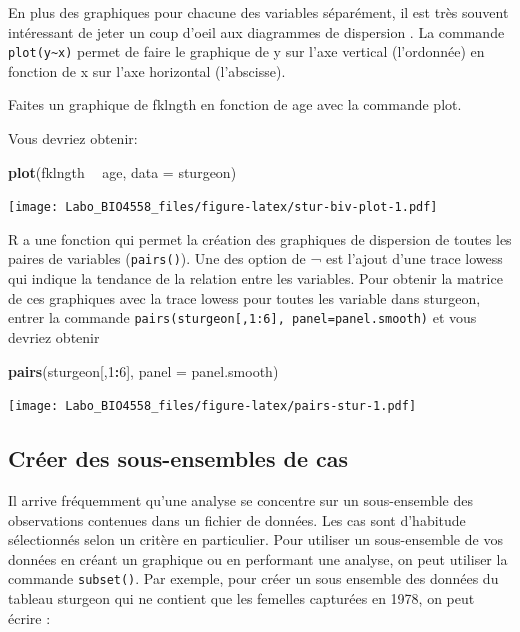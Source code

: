 \documentclass[12pt,]{book}
\makeatletter
\newenvironment{Shaded}{\begin{snugshade}}{\end{snugshade}}
\newcommand{\DataTypeTok}[1]{\textcolor[rgb]{0.27,0.27,0.27}{#1}}
\newcommand{\DecValTok}[1]{\textcolor[rgb]{0.06,0.06,0.06}{#1}}
\newcommand{\KeywordTok}[1]{\textcolor[rgb]{0.27,0.27,0.27}{\textbf{#1}}}
\newcommand{\NormalTok}[1]{#1}
\newcommand{\OperatorTok}[1]{\textcolor[rgb]{0.43,0.43,0.43}{\textbf{#1}}}
\newcommand{\StringTok}[1]{\textcolor[rgb]{0.5,0.5,0.5}{#1}}
\newenvironment{kframe}{%
\medskip{}
\setlength{\fboxsep}{.8em}
 \def\at@end@of@kframe{}%
 \ifinner\ifhmode%
  \def\at@end@of@kframe{\end{minipage}}%
  \begin{minipage}{\columnwidth}%
 \fi\fi%
 \def\FrameCommand##1{\hskip\@totalleftmargin \hskip-\fboxsep
 \colorbox{shadecolor}{##1}\hskip-\fboxsep
     \hskip-\linewidth \hskip-\@totalleftmargin \hskip\columnwidth}%
 \MakeFramed {\advance\hsize-\width
   \@totalleftmargin\z@ \linewidth\hsize
   \@setminipage}}%
 {\par\unskip\endMakeFramed%
 \at@end@of@kframe}
\newenvironment{rmdblock}[1]
  {
  \begin{itemize}
  \renewcommand{\labelitemi}{
    \raisebox{-.7\height}[0pt][0pt]{
      {\setkeys{Gin}{width=3em,keepaspectratio}\texttt{[image: images/\#1]}}
    }
  }
  \setlength{\fboxsep}{1em}
  \begin{kframe}
  \item
  }
  {
  \end{kframe}
  \end{itemize}
  }
\newenvironment{rmdcode}
  {\begin{rmdblock}{screen}}
  {\end{rmdblock}}
\makeatother
\begin{document}
En plus des graphiques pour chacune des variables séparément, il est très souvent intéressant de jeter un coup d'oeil aux diagrammes de dispersion .
La commande \texttt{plot(y\textasciitilde{}x)} permet de faire le graphique de y sur l'axe vertical (l'ordonnée) en fonction de x sur l'axe horizontal (l'abscisse).

\begin{rmdcode}
Faites un graphique de fklngth en fonction de age avec la commande plot.
\end{rmdcode}

Vous devriez obtenir:

\begin{Shaded}
\begin{Highlighting}[]
\KeywordTok{plot}\NormalTok{(fklngth }\OperatorTok{~}\StringTok{ }\NormalTok{age, }\DataTypeTok{data =}\NormalTok{ sturgeon)}
\end{Highlighting}
\end{Shaded}

\texttt{[image: Labo\_BIO4558\_files/figure-latex/stur-biv-plot-1.pdf]}

R a une fonction qui permet la création des graphiques de dispersion de toutes les paires de variables (\texttt{pairs()}).
Une des option de ¬ est l'ajout d'une trace lowess qui indique la tendance de la relation entre les variables.
Pour obtenir la matrice de ces graphiques avec la trace lowess pour toutes les variable dans sturgeon, entrer la commande \texttt{pairs(sturgeon{[},1:6{]},\ panel=panel.smooth)} et vous devriez obtenir

\begin{Shaded}
\begin{Highlighting}[]
\KeywordTok{pairs}\NormalTok{(sturgeon[,}\DecValTok{1}\OperatorTok{:}\DecValTok{6}\NormalTok{], }\DataTypeTok{panel =}\NormalTok{ panel.smooth)}
\end{Highlighting}
\end{Shaded}

\texttt{[image: Labo\_BIO4558\_files/figure-latex/pairs-stur-1.pdf]}

\hypertarget{cruxe9er-des-sous-ensembles-de-cas}{%
\subsection{Créer des sous-ensembles de cas}\label{cruxe9er-des-sous-ensembles-de-cas}}

Il arrive fréquemment qu'une analyse se concentre sur un sous-ensemble des observations contenues dans un fichier de données.
Les cas sont d'habitude sélectionnés selon un critère en particulier.
Pour utiliser un sous-ensemble de vos données en créant un graphique ou en performant une analyse, on peut utiliser la commande \texttt{subset()}.
Par exemple, pour créer un sous ensemble des données du tableau sturgeon qui ne contient que les femelles capturées en 1978, on peut écrire :
\end{document}
